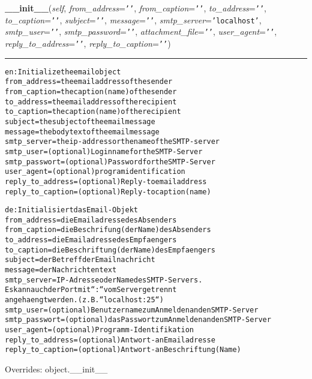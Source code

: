 \hspace{.8\funcindent}\begin{boxedminipage}{\funcwidth}

    \raggedright \textbf{\_\_init\_\_}(\textit{self}, \textit{from\_address}={\tt \texttt{'}\texttt{}\texttt{'}}, \textit{from\_caption}={\tt \texttt{'}\texttt{}\texttt{'}}, \textit{to\_address}={\tt \texttt{'}\texttt{}\texttt{'}}, \textit{to\_caption}={\tt \texttt{'}\texttt{}\texttt{'}}, \textit{subject}={\tt \texttt{'}\texttt{}\texttt{'}}, \textit{message}={\tt \texttt{'}\texttt{}\texttt{'}}, \textit{smtp\_server}={\tt \texttt{'}\texttt{localhost}\texttt{'}}, \textit{smtp\_user}={\tt \texttt{'}\texttt{}\texttt{'}}, \textit{smtp\_password}={\tt \texttt{'}\texttt{}\texttt{'}}, \textit{attachment\_file}={\tt \texttt{'}\texttt{}\texttt{'}}, \textit{user\_agent}={\tt \texttt{'}\texttt{}\texttt{'}}, \textit{reply\_to\_address}={\tt \texttt{'}\texttt{}\texttt{'}}, \textit{reply\_to\_caption}={\tt \texttt{'}\texttt{}\texttt{'}})

    \vspace{-1.5ex}

    \rule{\textwidth}{0.5\fboxrule}
\setlength{\parskip}{2ex}
\begin{alltt}

en: Initialize the email object
    from\_address     = the email address of the sender
    from\_caption     = the caption (name) of the sender
    to\_address       = the email address of the recipient
    to\_caption       = the caption (name) of the recipient
    subject          = the subject of the email message
    message          = the body text of the email message
    smtp\_server      = the ip-address or the name of the SMTP-server
    smtp\_user        = (optional) Login name for the SMTP-Server
    smtp\_passwort    = (optional) Password for the SMTP-Server
    user\_agent       = (optional) program identification
    reply\_to\_address = (optional) Reply-to email address
    reply\_to\_caption = (optional) Reply-to caption (name)

de: Initialisiert das Email-Objekt
    from\_address     = die Emailadresse des Absenders
    from\_caption     = die Beschrifung (der Name) des Absenders
    to\_address       = die Emailadresse des Empfaengers
    to\_caption       = die Beschriftung (der Name) des Empfaengers
    subject          = der Betreff der Emailnachricht
    message          = der Nachrichtentext
    smtp\_server      = IP-Adresse oder Name des SMTP-Servers.
                       Es kann auch der Port mit ``:`` vom Server getrennt 
                       angehaengt werden. (z.B. ``localhost:25``)
    smtp\_user        = (optional) Benutzername zum Anmelden an den SMTP-Server
    smtp\_passwort    = (optional) das Passwort zum Anmelden an den SMTP-Server
    user\_agent       = (optional) Programm-Identifikation
    reply\_to\_address = (optional) Antwort-an Emailadresse
    reply\_to\_caption = (optional) Antwort-an Beschriftung (Name)
\end{alltt}

\setlength{\parskip}{1ex}
      Overrides: object.\_\_init\_\_

    \end{boxedminipage}


